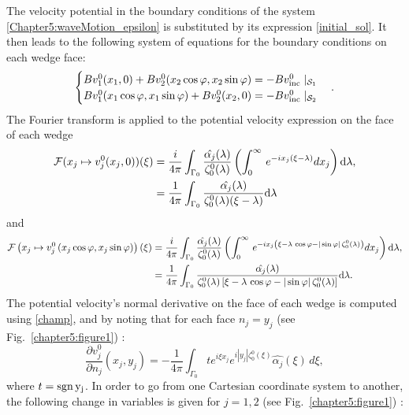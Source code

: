 The velocity potential in the boundary conditions of the system \eqref{Chapter5:waveMotion_epsilon} is substituted by its expression \eqref{initial_sol}. It then leads to the following system of equations for the boundary conditions on each wedge face:
\begin{equation}
\label{CL}
\begin{cases}
Bv_1^0(x_1,0) + Bv_2^0(x_2 \cos \varphi,x_2 \sin \varphi)  =  -Bv^0_{\rm inc} \mid_{\mathcal{S}_1}\\
Bv_1^0(x_1 \cos \varphi,x_1 \sin \varphi) + Bv_2^0(x_2,0)   =  -Bv^0_{\rm inc} \mid_{\mathcal{S}_2}
\end{cases}.
\end{equation}
The Fourier transform is applied to the potential velocity expression on the face of each wedge
\begin{align}
\mathcal{F}(x_j \mapsto v_j^0 (x_j,0))(\xi) & =  \dfrac{i}{4\pi} \int_{\Gamma_0}  \dfrac{\hat{\alpha_j}(\lambda)}{\zeta_0^0(\lambda)}  \left( \int_0^{\infty} \, e^{-i x_j (\xi-\lambda)} dx_j \right) {\rm d} \lambda,\\
& =  \dfrac{1}{4\pi} \int_{\Gamma_0} \dfrac{\hat{\alpha_j}(\lambda)}{\zeta_0^0(\lambda) (\xi - \lambda)} {\rm d} \lambda \nonumber
\end{align}
and
\begin{align}
\mathcal{F} \left( x_j \mapsto v_j^0 \left( x_j \cos \varphi,x_j \sin \varphi \right) \right)(\xi)  & =  \dfrac{i}{4\pi} \int_{\Gamma_0}  \dfrac{\hat{\alpha_j}(\lambda)}{\zeta_0^0(\lambda)}  \left( \int_0^{\infty} \, e^{-i x_j \left( \xi - \lambda  \, \cos \varphi - |\sin \varphi| \, \zeta_0^0(\lambda) \right)} dx_j \right) {\rm d} \lambda,\\
& = \dfrac{1}{4\pi} \int_{\Gamma_0} \dfrac{ \hat{\alpha_j}(\lambda)}{\zeta_0^0(\lambda) \left[ \xi - \lambda \, \cos \varphi  - |\sin \varphi| \, \zeta_0^0(\lambda) \right]} {\rm d} \lambda.  \nonumber
\end{align}
The potential velocity's normal derivative on the face of each wedge is computed using \eqref{champ}, and by noting that for each face $n_j=y_j$ (see Fig.~\ref{chapter5:figure1}) :
\begin{equation}
\frac{\partial v_j^0}{\partial n_j}(x_j,y_j) = -\frac{1}{4\pi} \int_{\Gamma_0} te^{i\xi x_j}e^{i|y_j|\zeta_0^0(\xi)} \hat{\alpha_j}(\xi)\, d\xi,
\end{equation}
where $t= \rm sgn \, y_j$. In order to go from one Cartesian coordinate system to another, the following change in variables is given for $j=1,2$ (see Fig.~\ref{chapter5:figure1}) :
